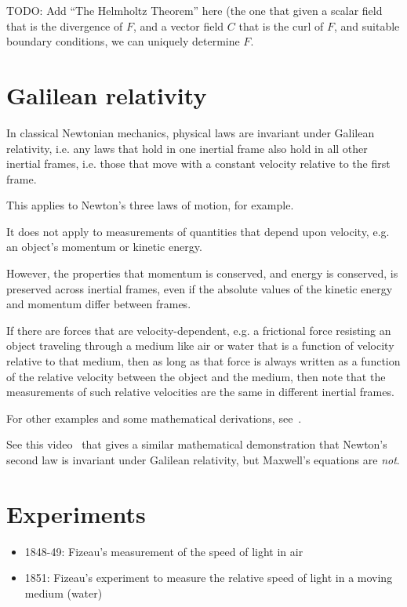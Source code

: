 \documentclass[a4paper]{article}
\theoremstyle{plain}
\theoremstyle{definition}
\begin{document}
TODO: Add ``The Helmholtz Theorem'' here (the one that given a scalar
field that is the divergence of $F$, and a vector field $C$ that is
the curl of $F$, and suitable boundary conditions, we can uniquely
determine $F$.


\section{Galilean relativity}

In classical Newtonian mechanics, physical laws are invariant under
Galilean relativity, i.e. any laws that hold in one inertial frame
also hold in all other inertial frames, i.e. those that move with a
constant velocity relative to the first frame.

This applies to Newton's three laws of motion, for example.

It does not apply to measurements of quantities that depend upon
velocity, e.g. an object's momentum or kinetic energy.

However, the properties that momentum is conserved, and energy is
conserved, is preserved across inertial frames, even if the absolute
values of the kinetic energy and momentum differ between frames.

If there are forces that are velocity-dependent, e.g. a frictional
force resisting an object traveling through a medium like air or water
that is a function of velocity relative to that medium, then as long
as that force is always written as a function of the relative velocity
between the object and the medium, then note that the measurements of
such relative velocities are the same in different inertial frames.

For other examples and some mathematical derivations,
see~\cite{GalileanTransformation}.

See this video~\cite{GalileanInvarianceMaxwellsEquations} that gives a
similar mathematical demonstration that Newton's second law is
invariant under Galilean relativity, but Maxwell's equations are {\em
  not}.


\section{Experiments}

\begin{itemize}
\item 1848-49: Fizeau's measurement of the speed of light in
  air~\cite{Fizeau1849}
\item 1851: Fizeau's experiment to measure the relative speed of light
  in a moving medium (water)~\cite{Fizeau1851}
\end{itemize}
\end{document}
